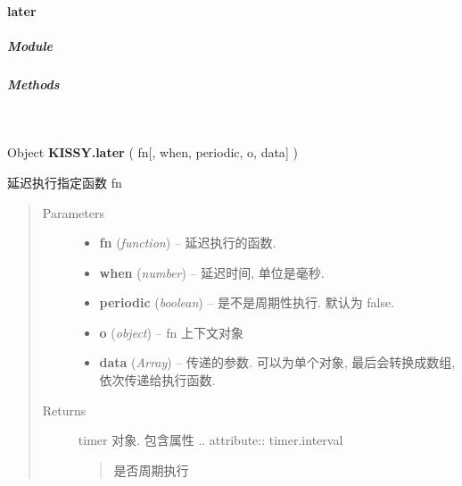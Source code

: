 \documentclass[letterpaper,10pt,english]{sphinxmanual}
\begin{document}
\paragraph{later}
\label{api/seed/lang/later:later}\label{api/seed/lang/later::doc}

\subparagraph{Module}
\label{api/seed/lang/later:module}\begin{quote}

{\hyperref[api/seed/lang/index:module-Lang]{}}
\end{quote}


\subparagraph{Methods}
\label{api/seed/lang/later:methods}

\begin{fulllineitems}
\label{api/seed/lang/later:Lang.KISSY.later}~
\begin{DUlineblock}{0em}
\item[] Object \textbf{KISSY.later} ( fn{[}, when, periodic, o, data{]} )
\item[] 延迟执行指定函数 fn
\end{DUlineblock}
\begin{quote}\begin{description}
\item[{Parameters}] \leavevmode\begin{itemize}
\item {}
\textbf{fn} (\emph{function}) -- 延迟执行的函数.

\item {}
\textbf{when} (\emph{number}) -- 延迟时间, 单位是毫秒.

\item {}
\textbf{periodic} (\emph{boolean}) -- 是不是周期性执行. 默认为 false.

\item {}
\textbf{o} (\emph{object}) -- fn 上下文对象

\item {}
\textbf{data} (\emph{Array}) -- 传递的参数. 可以为单个对象, 最后会转换成数组, 依次传递给执行函数.

\end{itemize}

\item[{Returns}] \leavevmode

timer 对象. 包含属性
.. attribute:: timer.interval
\begin{quote}

是否周期执行
\end{quote}


\end{description}
\end{quote}
\end{fulllineitems}
\end{document}

